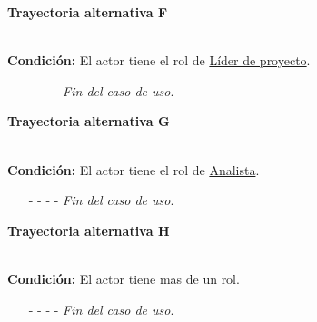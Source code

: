	
	\hypertarget{CU1:TAF}{\textbf{Trayectoria alternativa F}}\\
	\noindent \textbf{Condición:} El actor tiene el rol de \hyperlink{jefe}{Líder de proyecto}.
	\begin{enumerate}
		\UCpaso[\UCsist] Muestra la pantalla .
		\item[- -] - - {\em {Fin del caso de uso}}.
	\end{enumerate}

\hypertarget{CU1:TAG}{\textbf{Trayectoria alternativa G}}\\
\noindent \textbf{Condición:} El actor tiene el rol de \hyperlink{analista}{Analista}.
\begin{enumerate}
	\UCpaso[\UCsist] Muestra la pantalla .
	\item[- -] - - {\em {Fin del caso de uso}}.
\end{enumerate}

\hypertarget{CU1:TAH}{\textbf{Trayectoria alternativa H}}\\
\noindent \textbf{Condición:} El actor tiene mas de un rol.
\begin{enumerate}
	\UCpaso[\UCsist] Muestra la pantalla emergente  en la cual permite elegir al actor con que rol desea iniciar sesión.
	\UCpaso[\UCactor] Elije el rol con el que desea iniciar sesión.
	\UCpaso[\UCsist] Muestra la pantalla correspondiente a el rol que el actor eligió. 
	\item[- -] - - {\em {Fin del caso de uso}}.
\end{enumerate}
